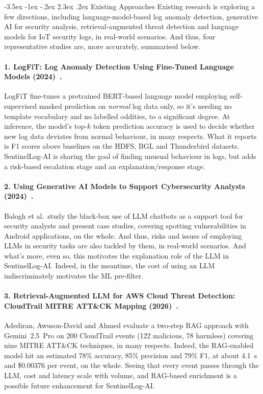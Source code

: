 \documentclass[12pt,a4paper]{report}
\makeatletter
\renewcommand\section{\@startsection {section}{1}{\z@}%
  {-3.5ex \@plus -1ex \@minus -.2ex}%
  {2.3ex \@plus .2ex}%
  {\normalfont\fontsize{17}{21}\selectfont\bfseries}}
\makeatother
\begin{document}
\section{Existing Approaches}
Existing research is exploring a few directions, including language-model-based log anomaly detection, generative AI for security analysis, retrieval-augmented threat detection and language models for IoT security logs, in real-world scenarios. And thus, four representative studies are, more accurately, summarised below.

\paragraph{1. LogFiT: Log Anomaly Detection Using Fine-Tuned Language Models (2024)~\cite{logfit}.}
LogFiT fine-tunes a pretrained BERT-based language model employing self-supervised masked prediction on \emph{normal} log data only, so it's needing no template vocabulary and no labelled oddities, to a significant degree. At inference, the model's top-$k$ token prediction accuracy is used to decide whether new log data deviates from normal behaviour, in many respects. What it reports is F1 scores above baselines on the HDFS, BGL and Thunderbird datasets. SentinelLog-AI is sharing the goal of finding unusual behaviour in logs, but adds a risk-based escalation stage and an explanation/response stage.

\paragraph{2. Using Generative AI Models to Support Cybersecurity Analysts (2024)~\cite{balogh2024}.}
Balogh et al.\ study the black-box use of LLM chatbots as a support tool for security analysts and present case studies, covering spotting vulnerabilities in Android applications, on the whole. And thus, risks and issues of employing LLMs in security tasks are also tackled by them, in real-world scenarios. And what's more, even so, this motivates the explanation role of the LLM in SentinelLog-AI. Indeed, in the meantime, the cost of using an LLM indiscriminately motivates the ML pre-filter.

\paragraph{3. Retrieval-Augmented LLM for AWS Cloud Threat Detection: CloudTrail MITRE ATT\&CK Mapping (2026)~\cite{adediran2026}.}
Adediran, Awuson-David and Ahmed evaluate a two-step RAG approach with Gemini~2.5~Pro on 200 CloudTrail events (122 malicious, 78 harmless) covering nine MITRE ATT\&CK techniques, in many respects. Indeed, the RAG-enabled model hit an estimated 78\% accuracy, 85\% precision and 79\% F1, at about 4.1~s and \$0.00376 per event, on the whole. Seeing that every event passes through the LLM, cost and latency scale with volume, and RAG-based enrichment is a possible future enhancement for SentinelLog-AI.
\end{document}
